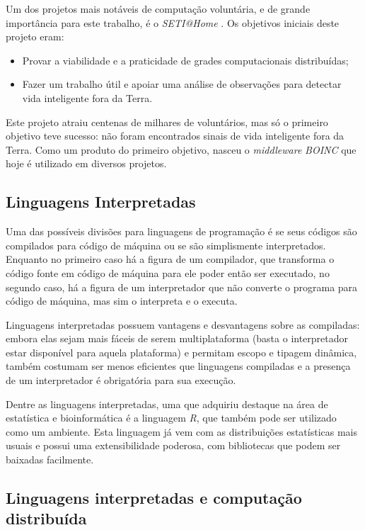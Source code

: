 Um dos projetos mais notáveis de computação voluntária, e de grande importância para este trabalho, é o \textit{SETI@Home} 
. Os objetivos iniciais deste projeto eram: 

\begin{itemize}
  \item Provar a viabilidade e a praticidade de grades computacionais distribuídas;
  \item Fazer um trabalho útil e apoiar uma análise de observações para detectar vida inteligente fora da Terra.
\end{itemize}

Este projeto atraiu centenas de milhares de voluntários, mas só o primeiro objetivo teve sucesso: não foram encontrados sinais 
de vida inteligente fora da Terra. Como um produto do primeiro objetivo, nasceu o \emph{middleware} 
\emph{BOINC} que hoje é utilizado em diversos projetos. 

\subsection{Linguagens Interpretadas}


Uma das possíveis divisões para linguagens de programação é se seus códigos são compilados para código de máquina ou se são simplismente 
interpretados. Enquanto no primeiro caso há a figura de um compilador, que transforma o código fonte em código de máquina 
para ele poder então ser executado, no segundo caso,
há a figura de um interpretador que não converte o programa para 
código de máquina, mas sim o interpreta e o executa. 

Linguagens interpretadas possuem vantagens e desvantagens sobre as compiladas: embora elas sejam mais fáceis 
de serem multiplataforma (basta o interpretador
estar disponível para aquela plataforma) e permitam escopo e tipagem dinâmica, também costumam ser menos eficientes que linguagens compiladas e 
a presença de um interpretador é obrigatória para sua execução. 

Dentre as linguagens interpretadas, uma que adquiriu destaque na área de estatística e bioinformática é a linguagem \emph{R}, que também 
pode ser utilizado como um ambiente. Esta linguagem já vem com as distribuições estatísticas mais usuais e possui uma extensibilidade 
poderosa, com bibliotecas que podem ser baixadas facilmente.


\subsection{Linguagens interpretadas e computação distribuída}

